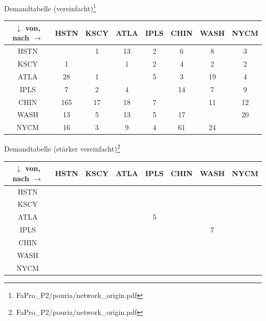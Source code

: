 \documentclass[aspectratio=169,10pt]{beamer}
\begin{document}
\begin{frame}{Demandtabelle (vereinfacht)\footnote{FaPro\_P2/pouria/network\_origin.pdf}}
\centering
\begin{tabular}{c|c|c|c|c|c|c|c}
$\downarrow$ von, nach $\rightarrow$ & HSTN  & KSCY & ATLA   & IPLS  & CHIN  & WASH  & NYCM\\
\hline
HSTN    & & 1 & 13 & 2 & 6 & 8 & 3\\
\hline
KSCY    & 1 & & 1 & 2 & 4 & 2 & 2\\
\hline
ATLA    & 28 & 1 & & 5 & 3 & 19 & 4\\
\hline
IPLS    & 7 & 2 & 4 & & 14 & 7 & 9\\
\hline
CHIN    & 165 & 17& 18 & 7 & & 11 & 12\\
\hline
WASH    & 13 & 5 & 13  & 5 & 17 & &20\\
\hline
NYCM    & 16 & 3 & 9 & 4 & 61 & 24 & 
\end{tabular}
\end{frame}
\begin{frame}{Demandtabelle (st\"arker vereinfacht)\footnote{FaPro\_P2/pouria/network\_origin.pdf}}
\centering
\begin{tabular}{c|c|c|c|c|c|c|c}
$\downarrow$ von, nach $\rightarrow$ & HSTN  & KSCY & ATLA   & IPLS  & CHIN  & WASH  & NYCM\\
\hline
HSTN    & & & & & & & \\
\hline
KSCY    & & & & & & & \\
\hline
ATLA    & & & & 5 & & & \\
\hline
IPLS    & & & & & & 7 & \\
\hline
CHIN    & & & & & & & \\
\hline
WASH    & & & & & & & \\
\hline
NYCM    & & & & & & & 
\end{tabular}
\end{frame}
\end{document}
